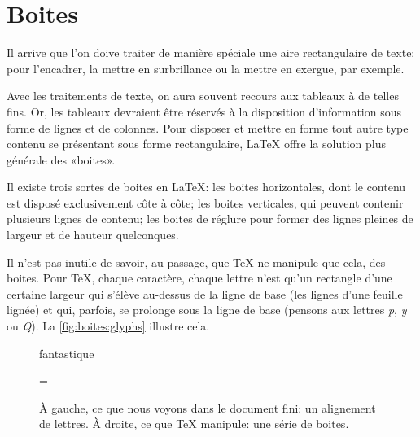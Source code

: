 
\chapter{Boites}
\label{chap:boites}

Il arrive que l'on doive traiter de manière spéciale une aire
rectangulaire de texte; pour l'encadrer, la mettre en surbrillance ou
la mettre en exergue, par exemple.

Avec les traitements de texte, on aura souvent recours aux tableaux à
de telles fins. Or, les tableaux devraient être réservés à la
disposition d'information sous forme de lignes et de colonnes. Pour
disposer et mettre en forme tout autre type contenu se présentant sous
forme rectangulaire, {\LaTeX} offre la solution plus générale des
«boites».

Il existe trois sortes de boites en {\LaTeX}: les boites horizontales,
dont le contenu est disposé exclusivement côte à côte; les boites
verticales, qui peuvent contenir plusieurs lignes de contenu; les
boites de réglure pour former des lignes pleines de largeur et de
hauteur quelconques.

Il n'est pas inutile de savoir, au passage, que {\TeX} ne manipule que
cela, des boites. Pour {\TeX}, chaque caractère, chaque lettre n'est
qu'un rectangle d'une certaine largeur qui s'élève au-dessus de la
ligne de base (les lignes d'une feuille lignée) et qui, parfois, se
prolonge sous la ligne de base (pensons aux lettres \emph{p}, \emph{y}
ou \emph{Q}). La \autoref{fig:boites:glyphs} illustre cela.

\begin{figure}[t]
  \begin{minipage}{0.45\linewidth}
    \centering\huge
    fantastique
  \end{minipage}
  \hfill
  \begin{minipage}{0.45\linewidth}
    \fboxrule=0.1pt
    \fboxsep=-\fboxrule
    \makeatletter
    \def\SOUL@soeverytoken{%
      \fbox{\color{white}\the\SOUL@token}}
    \makeatother
    \centering
  \end{minipage}
  \caption{À gauche, ce que nous voyons dans le document fini: un
    alignement de lettres. À droite, ce que {\TeX} manipule: une série
    de boites.}
  \label{fig:boites:glyphs}
\end{figure}

